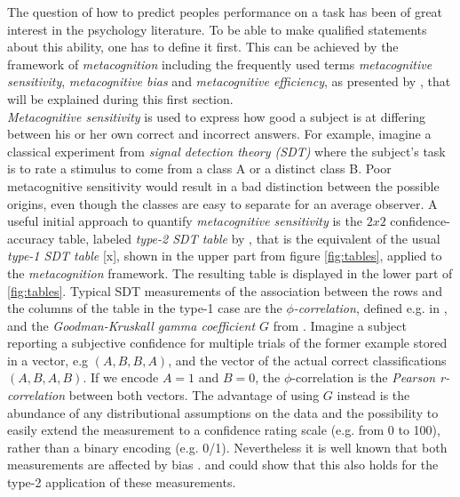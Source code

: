 \documentclass[../main/main.tex]{subfiles}
\begin{document}
	The question of how to predict peoples performance on a task has been of great interest in the psychology literature. To be able to make qualified statements about this ability, one has to define it first.
	This can be achieved by the framework of \textit{metacognition} including the frequently used terms \textit{metacognitive sensitivity}, \textit{metacognitive bias} and \textit{metacognitive efficiency}, as presented by \cite{fleming2014measure}, that will be explained during this first section.\\
	\textit{Metacognitive sensitivity} is used to express how good a subject is at differing between his or her own correct and incorrect answers. For example, imagine a classical experiment from \textit{signal detection theory (SDT)} where the subject's task is to rate a stimulus to come from a class A or a distinct class B. Poor metacognitive sensitivity would result in a bad distinction between the possible origins, even though the classes are easy to separate for an average observer. A useful initial approach to quantify \textit{metacognitive sensitivity} is the $2x2$ confidence-accuracy table, labeled \textit{type-2 SDT table} by \cite{fleming2014measure}, that is the equivalent of the usual \textit{type-1 SDT table} [x], shown in the upper part from figure \ref{fig:tables}, applied to the \textit{metacognition} framework. The resulting table is displayed in the lower part of \ref{fig:tables}. Typical SDT measurements of the association between the rows and the columns of the table in the type-1 case are the \textit{$\phi$-correlation}, defined e.g. in \cite{cramer1999mathematical}, and the \textit{Goodman-Kruskall gamma coefficient $G$} from \cite{goodman1963measures}. Imagine a subject reporting a subjective confidence for multiple trials of the former example stored in a vector, e.g $(A, B, B, A)$, and the vector of the actual correct classifications $(A, B, A, B)$. If we encode $A=1$ and $B=0$, the $\phi$-correlation is the \textit{Pearson r-correlation} between both vectors. The advantage of using $G$ instead is the abundance of any distributional assumptions on the data and the possibility to easily extend the measurement to a confidence rating scale (e.g. from 0 to 100), rather than a binary encoding (e.g. 0/1). Nevertheless it is well known that both measurements are affected by bias \cite{fleming2014measure}. \cite{nelson1984comparison} and \cite{masson2009sources} could show that this also holds for the type-2 application of these measurements.
\end{document}
